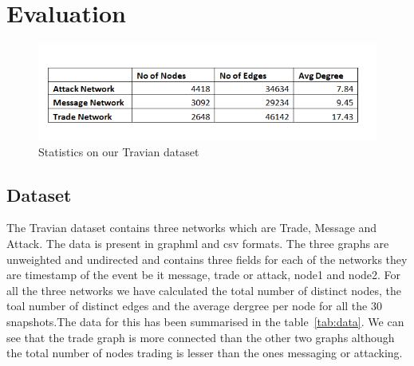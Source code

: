 \section{Evaluation}
\label{sec:eval}
\begin{figure}[t]
{
\setlength{\belowcaptionskip}{-15pt}
\includegraphics[width=\linewidth]{pics/1542805929316blob.jpg}  
\caption{Statistics on our Travian dataset}
\label{fig:algo2} 
}
\end{figure}






\subsection{Dataset}
\label{sec:dataset}

The Travian dataset contains three networks which are Trade, Message and
Attack. The data is  present in graphml and csv formats. The three graphs are
unweighted and undirected and contains three fields for each of the networks
they are timestamp of the event be it message, trade or attack, node1 and
node2. For all the three networks we have calculated the total number of
distinct nodes, the toal number of distinct edges and the average dergree per
node for all the 30 snapshots.The data for this has been summarised in the
table~\ref{tab:data}. We can see that the trade graph is more connected than
the  other two graphs although the total number of nodes trading is lesser
than the ones  messaging or attacking.











